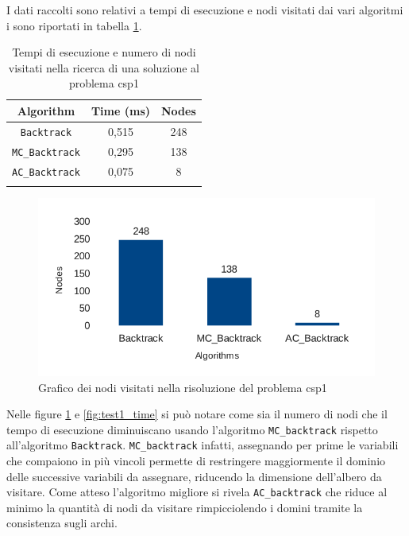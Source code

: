 \documentclass[10pt, a4paper]{article}
\begin{document}
I dati raccolti sono relativi a tempi di esecuzione e nodi visitati dai vari algoritmi i sono riportati in tabella \ref{tab:test1}.

\begin{longtable}{c c c}
\toprule
\textbf{Algorithm} & \textbf{Time (ms)} & \textbf{Nodes}\\
\midrule
\texttt{Backtrack} & 0,515 & 248 \\
\midrule
\texttt{MC\_Backtrack} & 0,295 & 138 \\
\midrule
\texttt{AC\_Backtrack} & 0,075 & 8 \\
\bottomrule
\caption{Tempi di esecuzione e numero di nodi visitati nella ricerca di una soluzione al problema csp1}
\label{tab:test1}
\end{longtable}

\begin{figure}[!h]
\begin{center}
\includegraphics[scale=0.7]{./report-images/test1_nodes.pdf}
\caption{Grafico dei nodi visitati nella risoluzione del problema csp1}
\label{fig:test1_nodes}
\end{center}
\end{figure}

Nelle figure \ref{fig:test1_nodes} e \ref{fig:test1_time} si può notare come sia il numero di nodi che il tempo di esecuzione diminuiscano usando l'algoritmo \texttt{MC\_backtrack} rispetto all'algoritmo \texttt{Backtrack}. \texttt{MC\_backtrack} infatti, assegnando per prime le variabili che compaiono in più vincoli permette di restringere maggiormente il dominio delle successive variabili da assegnare, riducendo la dimensione dell'albero da visitare. Come atteso l'algoritmo migliore si rivela \texttt{AC\_backtrack} che riduce al minimo la quantità di nodi da visitare rimpicciolendo i domini tramite la consistenza sugli archi.
\end{document}

